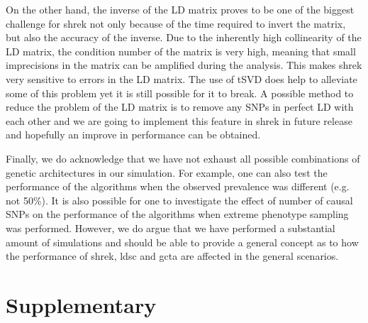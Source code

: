 	On the other hand, the inverse of the \gls{LD} matrix proves to be one of the biggest challenge for \gls{shrek} not only because of the time required to invert the matrix, but also the accuracy of the inverse.
	Due to the inherently high collinearity of the \gls{LD} matrix, the condition number of the matrix is very high, meaning that small imprecisions in the matrix can be amplified during the analysis. 
	This makes \gls{shrek} very sensitive to errors in the \gls{LD} matrix. 
	The use of \gls{tSVD} does help to alleviate some of this problem yet it is still possible for it to break.
	A possible method to reduce the problem of the \gls{LD} matrix is to remove any \glspl{SNP} in perfect \gls{LD} with each other and we are going to implement this feature in \gls{shrek} in future release and hopefully an improve in performance can be obtained.  
	
	Finally, we do acknowledge that we have not exhaust all possible combinations of genetic architectures in our simulation.
	For example, one can also test the performance of the algorithms when the observed prevalence was different (e.g. not 50\%).
	It is also possible for one to investigate the effect of number of causal \glspl{SNP} on the performance of the algorithms when extreme phenotype sampling was performed.
	However, we do argue that we have performed a substantial amount of simulations and should be able to provide a general concept as to how the performance of \gls{shrek}, \gls{ldsc} and \gls{gcta} are affected in the general scenarios.
	
	\newpage
\section{Supplementary}
	


	